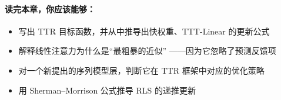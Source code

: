 \paragraph{读完本章，你应该能够：}
\begin{itemize}
  \item 写出 TTR 目标函数，并从中推导出快权重、TTT-Linear 的更新公式
  \item 解释线性注意力为什么是``最粗暴的近似''
        ——因为它忽略了预测反馈项
  \item 对一个新提出的序列模型层，判断它在 TTR 框架中对应的优化策略
  \item 用 Sherman--Morrison 公式推导 RLS 的递推更新
\end{itemize}
